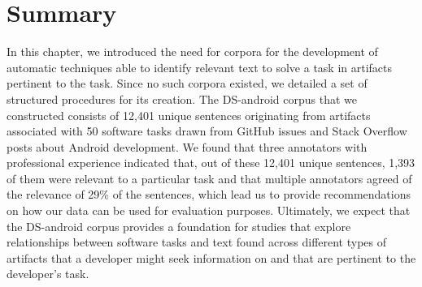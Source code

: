 
\section{Summary}
\label{cp4:corpus-summary}

In this chapter, we introduced the need for corpora 
for the development of 
automatic techniques able to identify relevant text
to solve a task in artifacts
pertinent to the task.
Since  no such corpora
existed, we detailed 
a set of structured procedures for its creation. 
The \acs{DS-android} corpus that we constructed consists of  
12,401 unique sentences
originating from artifacts associated with 50 software tasks
drawn from GitHub issues and Stack Overflow posts about Android development. 
We found that 
three annotators with professional experience indicated that,
out of these 12,401 unique sentences, 
1,393 of them were relevant to a particular task and that multiple annotators agreed of the relevance of 29\% of the sentences,
which lead us to provide recommendations on how our data can be used for evaluation purposes.
Ultimately, we expect that the \acs{DS-android} corpus
provides a foundation for studies that explore relationships between software tasks and text found across different types of artifacts that a developer might seek information on and that are pertinent to the developer's task.
 
